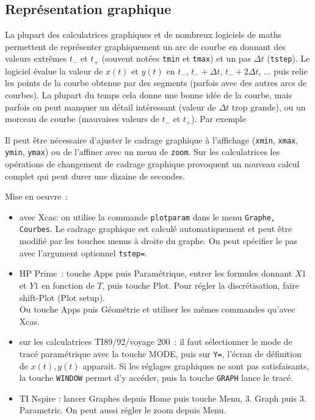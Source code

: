 \documentclass[a4paper,11pt]{article}
\begin{document}
\begin{giacjshere}
\subsection{Repr\'esentation graphique} 
La plupart des calculatrices graphiques
et de nombreux logiciels de maths permettent de
repr\'esenter graphiquement un arc de courbe en donnant des valeurs
extr\^emes $t_-$ et $t_+$ (souvent not\'ees \verb|tmin| et
\verb|tmax|) et un pas $\Delta t$ (\verb|tstep|). Le logiciel \'evalue
la valeur de $x(t)$ et $y(t)$ en $t_-$, $t_-+\Delta t$, $t_-+2\Delta
t$, ... puis relie les points de la courbe obtenue par des segments
(parfois avec des autres arcs de courbes). La plupart du temps
cela donne une bonne id\'ee de la courbe, mais parfois on peut
manquer un d\'etail int\'eressant (valeur de $\Delta t$ trop
grande), ou un morceau de courbe (mauvaises
valeurs de $t_-$ et $t_+$). Par exemple 

Il peut \^etre n\'ecessaire d'ajuster le cadrage graphique
\`a l'affichage (\verb|xmin|, \verb|xmax|, \verb|ymin|, \verb|ymax|) ou
de l'affiner avec un menu de \verb|zoom|. Sur les calculatrices
les op\'erations de changement de cadrage graphique
provoquent un nouveau calcul complet qui peut durer une
dizaine de secondes.

Mise en oeuvre~:
\begin{itemize}
\item avec Xcas: on utilise la commande \verb|plotparam|
dans le menu \verb|Graphe, Courbes|. Le cadrage
graphique est calcul\'e automatiquement et peut \^etre
modifi\'e par les touches menus \`a droite du graphe.
On peut sp\'ecifier le pas avec l'argument optionnel \verb|tstep=|.
\item HP Prime~: touche Apps puis Param\'etrique, entrer les
formules donnant $X1$ et $Y1$ en fonction de $T$, puis touche
Plot. Pour r\'egler la discr\'etisation, faire shift-Plot (Plot
setup).\\
Ou touche Apps puis G\'eom\'etrie et utiliser les m\^emes commandes 
qu'avec Xcas.
\item sur les calculatrices TI89/92/voyage 200~: il faut s\'electionner le mode
de trac\'e param\'etrique avec la touche MODE,
puis sur \verb|Y=|, l'\'ecran de d\'efinition
de $x(t),y(t)$ apparait. Si les r\'eglages graphiques
ne sont pas satisfaisants, la touche \verb|WINDOW|
permet d'y acc\'eder, puis la touche \verb|GRAPH| lance
le trac\'e.
\item TI Nspire : lancer Graphes depuis Home puis touche Menu,
3. Graph puis 3. Parametric. On peut aussi r\'egler le zoom depuis Menu.
\end{itemize}


\end{giacjshere}
\end{document}

